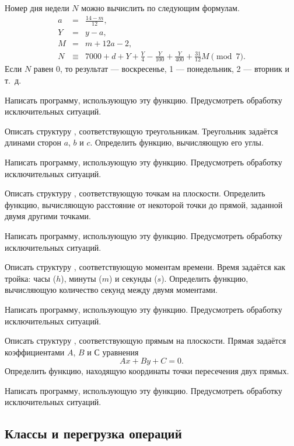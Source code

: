 Номер дня недели $N$ можно вычислить по следующим формулам.
\begin{eqnarray*}
a &=& \frac{14 - m}{12},\\
Y &=& y - a,\\
M &=& m + 12a - 2,\\
N &\equiv& 7000 + d + Y + \frac{Y}{4} - \frac{Y}{100} + \frac{Y}{400} + \frac{31}{12}M \pmod{7}.
\end{eqnarray*}
Если $N$ равен 0, то результат — воскресенье, 1 — понедельник, 2 —
вторник и т.~д.

Написать программу, использующую эту функцию. Предусмотреть обработку
исключительных ситуаций.

\task Описать структуру , соответствующую
треугольникам. Треугольник задаётся длинами сторон $a$, $b$ и $c$.
Определить функцию, вычисляющую его углы.

Написать программу, использующую эту функцию. Предусмотреть обработку
исключительных ситуаций.

\task Описать структуру , соответствующую точкам на
плоскости. Определить функцию, вычисляющую расстояние от некоторой
точки до прямой, заданной двумя другими точками.

Написать программу, использующую эту функцию. Предусмотреть обработку
исключительных ситуаций.

\task Описать структуру , соответствующую моментам
времени. Время задаётся как тройка: часы ($h$), минуты ($m$) и секунды
($s$). Определить функцию, вычисляющую количество секунд между двумя
моментами.

Написать программу, использующую эту функцию. Предусмотреть обработку
исключительных ситуаций.

\task Описать структуру , соответствующую прямым на
плоскости. Прямая задаётся коэффициентами $A$, $B$ и $С$ уравнения
\[
Ax+By+C=0.
\]
Определить функцию, находящую координаты точки пересечения двух
прямых.

Написать программу, использующую эту функцию. Предусмотреть обработку
исключительных ситуаций.


\subsection{Классы и перегрузка операций}

